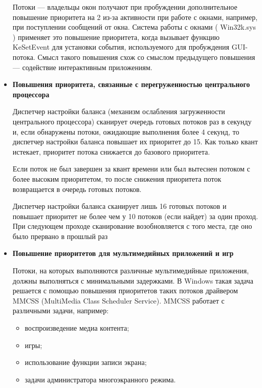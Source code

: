 \begin{itemize}
    Потоки — владельцы окон получают при пробуждении дополнительное повышение приоритета на 2 из-за активности при работе с окнами, например, при поступлении сообщений от окна. Система работы с окнами ( Win32k.sys ) применяет это повышение приоритета, когда вызывает функцию KeSetEvent для установки события, используемого для пробуждения GUI-потока. Смысл такого повышения схож со смыслом предыдущего повышения — содействие интерактивным приложениям.
    
    \item \textbf{Повышения приоритета, связанные с перегруженностью центрального процессора}
    
    Диспетчер настройки баланса (механизм ослабления загруженности центрального процессора) сканирует очередь готовых потоков раз в секунду и, если обнаружены потоки, ожидающие выполнения более 4 секунд, то диспетчер настройки баланса повышает их приоритет до 15. Как только квант истекает, приоритет потока снижается до базового приоритета.
    
    Если поток не был завершен за квант времени или был вытеснен потоком с более высоким приоритетом, то после снижения приоритета поток возвращается в очередь готовых потоков.

Диспетчер настройки баланса сканирует лишь 16 готовых потоков и повышает приоритет не более чем у 10 потоков (если найдет) за один
проход. При следующем проходе сканирование возобновляется с того места, где оно было прервано в прошлый раз

    \item \textbf{Повышение приоритетов для мультимедийных приложений и игр}
    
    Потоки, на которых выполняются различные мультимедийные приложения, должны выполняться с минимальными задержками. В Windows такая задача решается с помощью повышения приоритетов таких потоков драйвером MMCSS (MultiMedia Class Scheduler Service). MMCSS работает с различными задачи, например: 
    
    \begin{itemize}
        \item воспроизведение медиа контента;
        \item игры;
        \item использование функции записи экрана;
        \item задачи администратора многоэкранного режима.
    \end{itemize}
\end{itemize}


